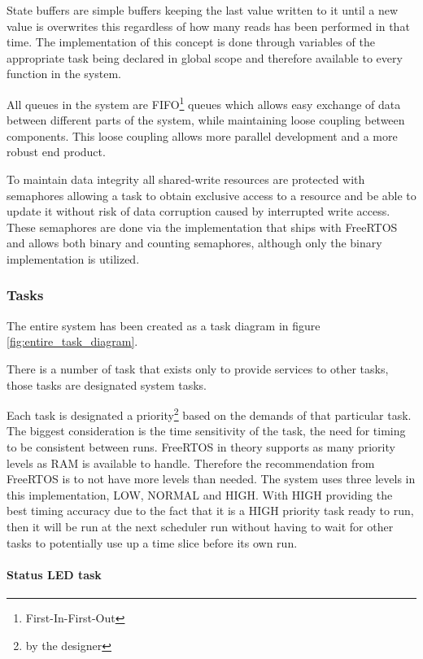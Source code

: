 \documentclass[../../../main]{subfiles}
\begin{document}
State buffers are simple buffers keeping the last value written to it until a new value is overwrites this regardless of how many reads has been performed in that time. The implementation of this concept is done through variables of the appropriate task being declared in global scope and therefore available to every function in the system.

All queues in the system are FIFO\footnote{First-In-First-Out} queues which allows easy exchange of data between different parts of the system, while maintaining loose coupling between components. This loose coupling allows more parallel development and a more robust end product.

To maintain data integrity all shared-write resources are protected with semaphores allowing a task to obtain exclusive access to a resource and be able to update it without risk of data corruption caused by interrupted write access.
These semaphores are done via the implementation that ships with FreeRTOS and allows both binary and counting semaphores, although only the binary implementation is utilized.



\subsubsection{Tasks}

The entire system has been created as a task diagram in figure \ref{fig:entire_task_diagram}.

There is a number of task that exists only to provide services to other tasks, those tasks are designated system tasks.

Each task is designated a priority\footnote{by the designer} based on the demands of that particular task. The biggest consideration is the time sensitivity of the task, the need for timing to be consistent between runs. FreeRTOS in theory supports as many priority levels as RAM is available to handle. Therefore  the recommendation from FreeRTOS is to not have more levels than needed. The system uses three levels in this implementation, LOW, NORMAL and HIGH. With HIGH providing the best timing accuracy due to the fact that it is a HIGH priority task  ready to run, then it will be run at the next scheduler run without having to wait for other tasks to potentially use up a time slice before its own run.


\paragraph{Status LED task}
\end{document}
